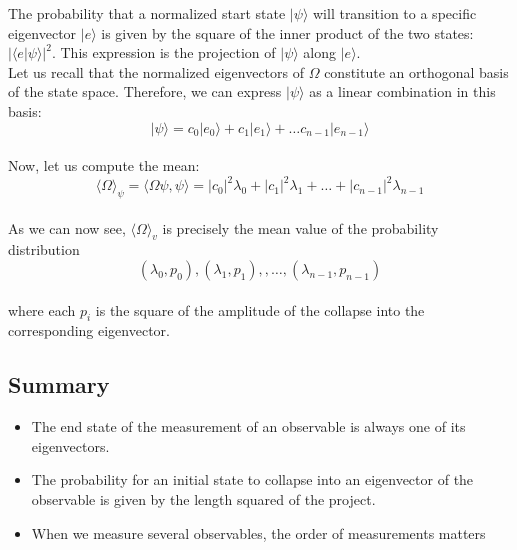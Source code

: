 \documentclass{article}
\begin{document}
The probability that a normalized start state $|\psi\rangle$ will transition to a specific eigenvector $|e\rangle$ is given by the square of the inner product of the two states: $|\langle e|\psi\rangle|^2$. This expression is the projection of $|\psi\rangle$ along $|e\rangle$.\\

Let us recall that the normalized eigenvectors of $\Omega$ constitute an orthogonal basis of the state space. Therefore, we can express $|\psi\rangle$ as a linear combination in this basis:
\begin{equation}
    |\psi\rangle = c_0|e_0\rangle + c_1|e_1\rangle + \ldots c_{n-1}|e_{n-1}\rangle 
\end{equation}\\
Now, let us compute the mean:
\begin{equation}
    \langle\Omega\rangle_\psi = \langle\Omega\psi, \psi\rangle = |c_0|^2\lambda_0+ |c_1|^2\lambda_1 + \ldots + |c_{n-1}|^2\lambda_{n-1}
\end{equation}\\
As we can now see, $\langle\Omega\rangle_v$ is precisely the mean value of the probability distribution
\begin{equation}
    (\lambda_0,p_0),  (\lambda_1,p_1),, \ldots,  (\lambda_{n-1},p_{n-1})
\end{equation}\\
where each $p_i$ is the square of the amplitude of the collapse into the corresponding eigenvector.

\subsection{Summary}

\begin{itemize}
    \item The end state of the measurement of an observable is always one of its eigenvectors.
    \item The probability for an initial state to collapse into an eigenvector of the observable is given by the length squared of the project.
    \item When we measure several observables, the order of measurements matters
\end{itemize}
\end{document}
